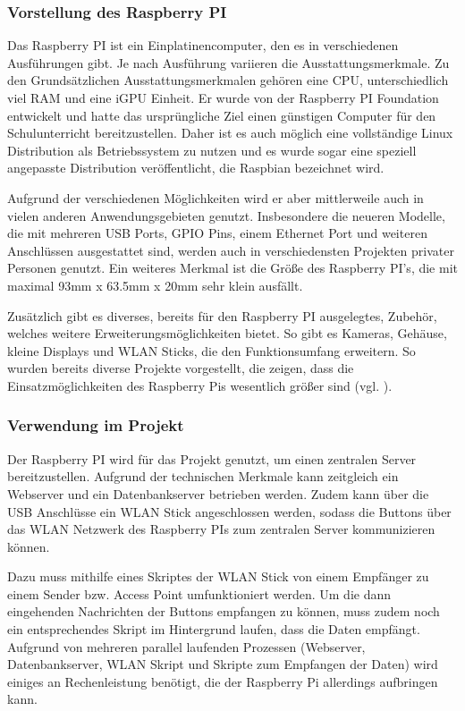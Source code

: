 
\subsubsection{Vorstellung des Raspberry PI}        
\label{sec:Vorstellung des Raspberry PI-1} 

Das Raspberry PI ist ein Einplatinencomputer, den es in verschiedenen Ausführungen gibt. Je nach Ausführung variieren die Ausstattungsmerkmale. Zu den Grundsätzlichen Ausstattungsmerkmalen gehören eine \ac{CPU}, unterschiedlich viel \ac{RAM} und eine \ac{iGPU} Einheit. Er wurde von der Raspberry PI Foundation entwickelt und hatte das ursprüngliche Ziel einen günstigen Computer für den Schulunterricht bereitzustellen. Daher ist es auch möglich eine vollständige Linux Distribution als Betriebssystem zu nutzen und es wurde sogar eine speziell angepasste Distribution veröffentlicht, die Raspbian bezeichnet wird. 

Aufgrund der verschiedenen Möglichkeiten wird er aber mittlerweile auch in vielen anderen Anwendungsgebieten genutzt. Insbesondere die neueren Modelle, die mit mehreren USB Ports, \ac{GPIO} Pins, einem Ethernet Port und weiteren Anschlüssen ausgestattet sind, werden auch in verschiedensten Projekten privater Personen genutzt. Ein weiteres Merkmal ist die Größe des Raspberry PI's, die mit maximal 93mm x 63.5mm x 20mm sehr klein ausfällt. 

Zusätzlich gibt es diverses, bereits für den Raspberry PI ausgelegtes, Zubehör, welches weitere Erweiterungsmöglichkeiten bietet. So gibt es Kameras, Gehäuse, kleine Displays und WLAN Sticks, die den Funktionsumfang erweitern. So wurden bereits diverse Projekte vorgestellt, die zeigen, dass die Einsatzmöglichkeiten des Raspberry Pis wesentlich größer sind (vgl. \cite{.28.12.2016} \cite{.28.01.2017}).



\subsubsection{Verwendung im Projekt}        
\label{sec:Verwendung des Raspberry PI-1} 
Der Raspberry PI wird für das Projekt genutzt, um einen zentralen Server bereitzustellen. Aufgrund der technischen Merkmale kann zeitgleich ein Webserver und ein Datenbankserver betrieben werden. Zudem kann über die USB Anschlüsse ein WLAN Stick angeschlossen werden, sodass die Buttons über das WLAN Netzwerk des Raspberry PIs zum zentralen Server kommunizieren können. 

Dazu muss mithilfe eines Skriptes der WLAN Stick von einem Empfänger zu einem Sender bzw. Access Point umfunktioniert werden. Um die dann eingehenden Nachrichten der Buttons empfangen zu können, muss zudem noch ein entsprechendes Skript im Hintergrund laufen, dass die Daten empfängt. Aufgrund von mehreren parallel laufenden Prozessen (Webserver, Datenbankserver, WLAN Skript und Skripte zum Empfangen der Daten) wird einiges an Rechenleistung benötigt, die der Raspberry Pi allerdings aufbringen kann. 

